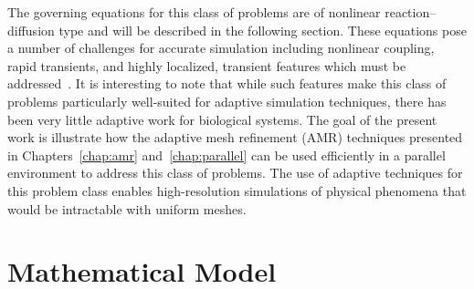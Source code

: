 The governing equations for this class of problems are of nonlinear reaction\---diffusion type and will be described in the following section.  These equations pose a number of challenges for accurate simulation including nonlinear coupling, rapid transients, and highly localized, transient features which must be addressed~\cite{staelens_thesis}.  It is interesting to note that while such features make this class of problems particularly well-suited for adaptive simulation techniques, there has been very little adaptive work for biological systems.  The goal of the present work is illustrate how the adaptive mesh refinement (AMR) techniques presented in Chapters~\ref{chap:amr} and~\ref{chap:parallel} can be used efficiently in a parallel environment to address this class of problems.  The use of adaptive techniques for this problem class enables high-resolution simulations of physical phenomena  that would be intractable with uniform meshes.  

\section{Mathematical Model}
